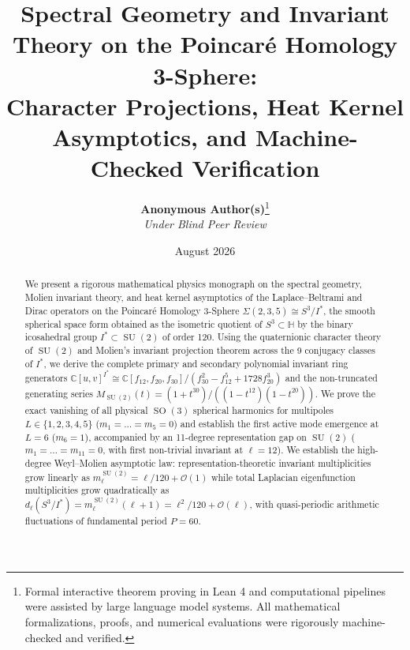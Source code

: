 \documentclass[11pt,a4paper]{article}
\title{\textbf{\Large Spectral Geometry and Invariant Theory on the Poincar\'e Homology 3-Sphere:\\Character Projections, Heat Kernel Asymptotics, and Machine-Checked Verification}}
\author{
  \textbf{Anonymous Author(s)}\thanks{Formal interactive theorem proving in Lean 4 and computational pipelines were assisted by large language model systems. All mathematical formalizations, proofs, and numerical evaluations were rigorously machine-checked and verified.}\\[0.4em]
  \small \textit{Under Blind Peer Review}
}
\date{\small August 2026}
\theoremstyle{definition}
\DeclareMathOperator{\SU}{SU}
\DeclareMathOperator{\SO}{SO}
\begin{document}
\maketitle

\begin{abstract}
We present a rigorous mathematical physics monograph on the spectral geometry, Molien invariant theory, and heat kernel asymptotics of the Laplace--Beltrami and Dirac operators on the Poincar\'e Homology 3-Sphere $\Sigma(2,3,5) \cong S^3 / I^*$, the smooth spherical space form obtained as the isometric quotient of $S^3 \subset \mathbb{H}$ by the binary icosahedral group $I^* \subset \SU(2)$ of order 120. Using the quaternionic character theory of $\SU(2)$ and Molien's invariant projection theorem across the 9 conjugacy classes of $I^*$, we derive the complete primary and secondary polynomial invariant ring generators $\mathbb{C}[u, v]^{I^*} \cong \mathbb{C}[f_{12}, f_{20}, f_{30}] / (f_{30}^2 - f_{12}^5 + 1728 f_{20}^3)$ and the non-truncated generating series $M_{\SU(2)}(t) = (1+t^{30})/((1-t^{12})(1-t^{20}))$. We prove the exact vanishing of all physical $\SO(3)$ spherical harmonics for multipoles $L \in \{1, 2, 3, 4, 5\}$ ($m_1 = \dots = m_5 = 0$) and establish the first active mode emergence at $L = 6$ ($m_6 = 1$), accompanied by an 11-degree representation gap on $\SU(2)$ ($m_1 = \dots = m_{11} = 0$, with first non-trivial invariant at $\ell = 12$). We establish the high-degree Weyl--Molien asymptotic law: representation-theoretic invariant multiplicities grow linearly as $m_\ell^{\SU(2)} = \ell / 120 + \mathcal{O}(1)$ while total Laplacian eigenfunction multiplicities grow quadratically as $d_\ell(S^3/I^*) = m_\ell^{\SU(2)}(\ell+1) = \ell^2 / 120 + \mathcal{O}(\ell)$, with quasi-periodic arithmetic fluctuations of fundamental period $P = 60$.


\end{abstract}
\end{document}
